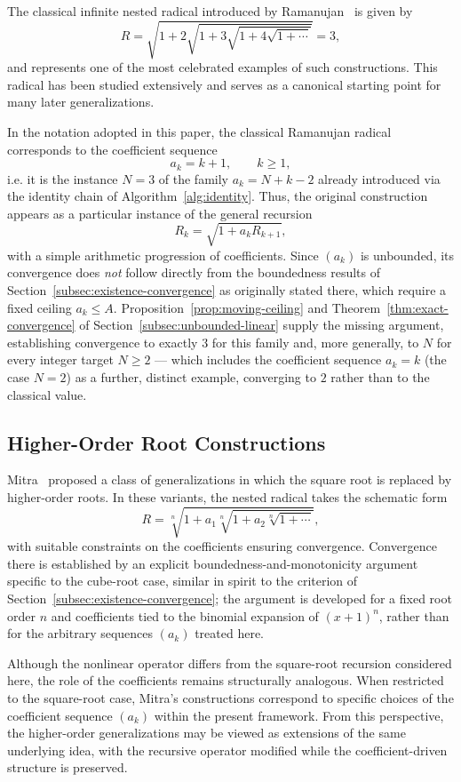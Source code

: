\documentclass[11pt,a4paper]{amsart}
\theoremstyle{plain}
\theoremstyle{definition}
\theoremstyle{remark}
\begin{document}
The classical infinite nested radical introduced by Ramanujan~\cite{RamanujanNotebooks} is given by
\[
R = \sqrt{1 + 2\sqrt{1 + 3\sqrt{1 + 4\sqrt{1 + \cdots}}}} = 3,
\]
and represents one of the most celebrated examples of such constructions. This radical has been studied extensively and serves as a canonical starting point for many later generalizations.

In the notation adopted in this paper, the classical Ramanujan radical corresponds to the coefficient sequence
\[
a_k = k+1, \qquad k \geq 1,
\]
i.e. it is the instance $N=3$ of the family $a_k = N+k-2$ already introduced via the identity chain of Algorithm~\ref{alg:identity}. Thus, the original construction appears as a particular instance of the general recursion
\[
R_k = \sqrt{1 + a_k R_{k+1}},
\]
with a simple arithmetic progression of coefficients. Since $(a_k)$ is unbounded, its convergence does \emph{not} follow directly from the boundedness results of Section~\ref{subsec:existence-convergence} as originally stated there, which require a fixed ceiling $a_k \le A$. Proposition~\ref{prop:moving-ceiling} and Theorem~\ref{thm:exact-convergence} of Section~\ref{subsec:unbounded-linear} supply the missing argument, establishing convergence to exactly $3$ for this family and, more generally, to $N$ for every integer target $N \ge 2$ — which includes the coefficient sequence $a_k = k$ (the case $N=2$) as a further, distinct example, converging to $2$ rather than to the classical value.

\subsection{Higher-Order Root Constructions}
\label{subsec:higher-order-roots}

Mitra~\cite{MitraNestedRadicals} proposed a class of generalizations in which the square root is replaced by higher-order roots. In these variants, the nested radical takes the schematic form
\[
R = \sqrt[n]{1 + a_1 \sqrt[n]{1 + a_2 \sqrt[n]{1 + \cdots}}},
\]
with suitable constraints on the coefficients ensuring convergence. Convergence there is established by an explicit boundedness-and-monotonicity argument specific to the cube-root case, similar in spirit to the criterion of Section~\ref{subsec:existence-convergence}; the argument is developed for a fixed root order $n$ and coefficients tied to the binomial expansion of $(x+1)^n$, rather than for the arbitrary sequences $(a_k)$ treated here.

Although the nonlinear operator differs from the square-root recursion considered here, the role of the coefficients remains structurally analogous. When restricted to the square-root case, Mitra’s constructions correspond to specific choices of the coefficient sequence $(a_k)$ within the present framework. From this perspective, the higher-order generalizations may be viewed as extensions of the same underlying idea, with the recursive operator modified while the coefficient-driven structure is preserved.
\end{document}
